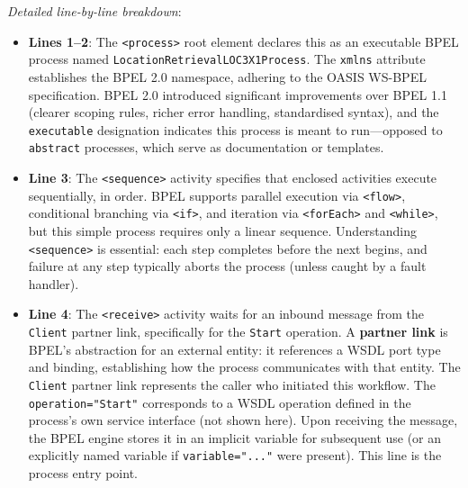 \documentclass[11pt]{article}
\begin{document}
\noindent\emph{Detailed line-by-line breakdown}:
\begin{itemize}
  \item \textbf{Lines 1--2}: The \texttt{<process>} root element declares this as an executable BPEL process named \texttt{LocationRetrievalLOC3X1Process}. The \texttt{xmlns} attribute establishes the BPEL 2.0 namespace, adhering to the OASIS WS-BPEL specification. BPEL 2.0 introduced significant improvements over BPEL 1.1 (clearer scoping rules, richer error handling, standardised syntax), and the \texttt{executable} designation indicates this process is meant to run—opposed to \texttt{abstract} processes, which serve as documentation or templates.
  
  \item \textbf{Line 3}: The \texttt{<sequence>} activity specifies that enclosed activities execute sequentially, in order. BPEL supports parallel execution via \texttt{<flow>}, conditional branching via \texttt{<if>}, and iteration via \texttt{<forEach>} and \texttt{<while>}, but this simple process requires only a linear sequence. Understanding \texttt{<sequence>} is essential: each step completes before the next begins, and failure at any step typically aborts the process (unless caught by a fault handler).
  
  \item \textbf{Line 4}: The \texttt{<receive>} activity waits for an inbound message from the \texttt{Client} partner link, specifically for the \texttt{Start} operation. A \textbf{partner link} is BPEL's abstraction for an external entity: it references a WSDL port type and binding, establishing how the process communicates with that entity. The \texttt{Client} partner link represents the caller who initiated this workflow. The \texttt{operation="Start"} corresponds to a WSDL operation defined in the process's own service interface (not shown here). Upon receiving the message, the BPEL engine stores it in an implicit variable for subsequent use (or an explicitly named variable if \texttt{variable="..."} were present). This line is the process entry point.
  

\end{itemize}
\end{document}

